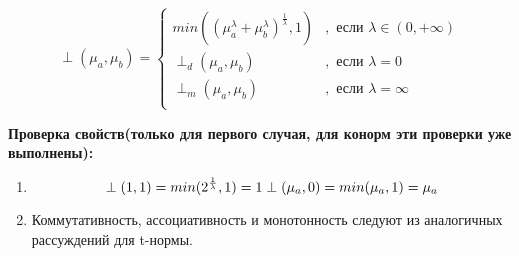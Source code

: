 \documentclass[12pt]{article}
\begin{document}
\begin{equation*}
\perp(\mu_a, \mu_b) =
\begin{cases}
   min\left((\mu_a^\lambda+\mu_b^\lambda)^{\frac{1}{\lambda}}, 1\right) &, \text{ если }\lambda\in(0, +\infty)\\
   \perp_d(\mu_a, \mu_b) &, \text{ если }\lambda=0\\
   \perp_m(\mu_a, \mu_b) &, \text{ если }\lambda=\infty\\
\end{cases}
\end{equation*}

\textbf{Проверка свойств(только для первого случая, для конорм эти проверки уже выполнены):}
\begin{enumerate}
    \item $$
      \perp(1, 1) = min(2^\frac{1}{\lambda}, 1) = 1
      \newline
      \perp(\mu_a, 0) = min(\mu_a, 1) = \mu_a
      $$
  \item Коммутативность, ассоциативность и монотонность следуют из аналогичных рассуждений для
      t-нормы. 
\end{enumerate}
\end{document}
